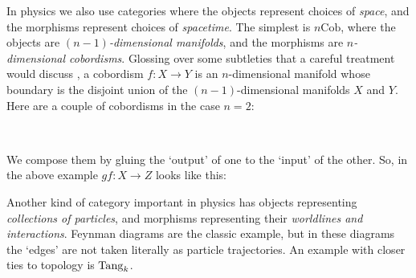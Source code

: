 \documentclass[12pt,twoside,openright]{report}
\newcommand{\Cob}{\mathrm{Cob}}
\newcommand{\Tang}{{\rm Tang}}
\newcommand{\maps}{\colon}
\newcommand{\multc}{
  \begin{scope}[left color=gray, right color=white]
    \shadedraw (1.5,2.5) 
      .. controls (1.5,1.1) and (.4,1.6) .. (.5,0) 
      .. controls (.4,-.25) and (-.4,-.25) .. (-.5,0)
      .. controls (-.4,1.6) and (-1.5,1.1) .. (-1.5,2.5)
      -- (-.5,2.5)
      .. controls (-.6,1.5)and (0.6,1.5) .. (.5,2.5)
      -- (1.5,2.5);
    \shadedraw (-1,2.5) ellipse (.5 and .2);
    \shadedraw (1,2.5) ellipse (.5 and .2);
  \end{scope}
  \draw[dashed] (0.5,0) arc (0:180:.5 and .2);
}
\newcommand{\medidentc}{
  \begin{scope}[left color=gray, right color=white]
    \shadedraw (-.5,2) -- (-.5,0)
      .. controls (-.4,-.25) and (.4,-.25) .. (.5,0)
      -- (.5,2) -- (-.5, 2);
    \shadedraw (0,2) ellipse (.5 and .2);
  \end{scope}
  \draw[dashed] (0.5,0) arc (0:180:.5 and 0.2);
}
\newcommand{\smallidentc}{
  \begin{scope}[left color=gray, right color=white]
    \shadedraw (-.5,1) -- (-.5,0)
      .. controls (-.4,-.25) and (.4,-.25) .. (.5,0)
      -- (.5,1) -- (-.5, 1);
    \shadedraw (0,1) ellipse (.5 and .2);
  \end{scope}
  \draw[dashed] (0.5,0) arc (0:180:.5 and 0.2);
}
\newcommand{\birthc}{
  \begin{scope}[left color=gray, right color=white]
    \shadedraw (-.5,0)
      .. controls (-.5,.9) and (0.5,.9) .. (.5,0)
      .. controls (.4,-.25) and (-.4,-.25) .. (-.5,0);
  \end{scope}
  \draw[dashed] (0.5,0) arc (0:180:.5 and 0.2);
}
\begin{document}
In physics we also use categories where the objects represent choices of {\em space}, and the morphisms represent choices of {\em spacetime}.  The simplest is $n\Cob$, where the objects are {\em
$(n-1)$-dimensional manifolds}, and the morphisms are {\em
$n$-dimensional cobordisms}.  Glossing over some subtleties that a careful treatment would discuss \cite{Sawin}, a cobordism 
$f \maps X \to Y$ is an $n$-dimensional manifold whose boundary is the disjoint union of the $(n-1)$-dimensional manifolds $X$ and $Y$. Here are a couple of cobordisms in the case $n = 2$:
\begin{center}
  $\qquad \qquad$
\end{center}
We compose them by gluing the `output' of one to the `input' of the other.   So, in the above example $gf \maps X \to Z$ looks like this:
\begin{center}
\end{center}

Another kind of category important in physics has objects representing
{\em collections of particles}, and morphisms representing their {\em worldlines and interactions}.  Feynman diagrams are the classic example, but in these diagrams the `edges' are not taken literally as particle trajectories.  An example with closer ties to topology is
$\Tang_k$.  
\end{document}
